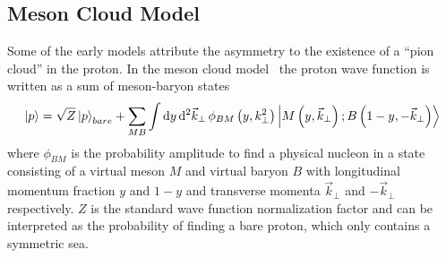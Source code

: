 \documentclass[../main.tex]{subfiles}
\begin{document}
\subsection{Meson Cloud Model}
Some of the early models attribute the asymmetry to the existence of a ``pion cloud'' in the proton.
In the meson cloud model~\cite{kumano1998,speth2002} the proton wave function is written as a sum of meson-baryon states
\begin{equation}
	\ket{p} = \sqrt{Z}\ket{p}_{bare} + \sum_{MB}\int \dd{y} \dd[2]{\vec{k}_\perp} \phi_{BM} \left(y, k^2_\perp\right)\ket{M\left(y, \vec{k}_\perp\right);B\left(1-y, -\vec{k}_\perp\right)}
\end{equation}
where $\phi_{BM}$ is the probability amplitude to find a physical nucleon in a state consisting of a virtual
meson $M$ and virtual baryon $B$ with longitudinal momentum fraction $y$ and $1-y$ and transverse momenta
$\vec{k}_\perp$ and $-\vec{k}_\perp$ respectively. $Z$ is the standard wave function normalization factor
and can be interpreted as the probability of finding a bare proton, which only contains a symmetric sea.
\end{document}
